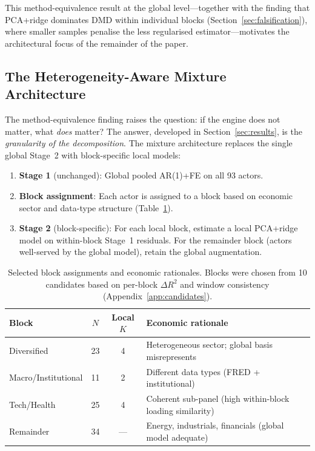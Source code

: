 \documentclass[11pt,a4paper]{article}
\begin{document}
This method-equivalence result at the global level---together with the finding that PCA+ridge dominates DMD within individual blocks (Section~\ref{sec:falsification}), where smaller samples penalise the less regularised estimator---motivates the architectural focus of the remainder of the paper.

\subsection{The Heterogeneity-Aware Mixture Architecture}
\label{sec:mixture_arch}

The method-equivalence finding raises the question: if the engine does not matter, what \emph{does} matter? The answer, developed in Section~\ref{sec:results}, is the \emph{granularity of the decomposition}. The mixture architecture replaces the single global Stage~2 with block-specific local models:

\begin{enumerate}[nosep]
  \item \textbf{Stage 1} (unchanged): Global pooled AR(1)+FE on all 93 actors.
  \item \textbf{Block assignment}: Each actor is assigned to a block based on economic sector and data-type structure (Table~\ref{tab:blocks}).
  \item \textbf{Stage 2} (block-specific): For each local block, estimate a local PCA+ridge model on within-block Stage~1 residuals. For the remainder block (actors well-served by the global model), retain the global augmentation.
\end{enumerate}

\begin{table}[H]
\centering
\caption{Selected block assignments and economic rationales. Blocks were chosen from 10 candidates based on per-block $\Delta R^2$ and window consistency (Appendix~\ref{app:candidates}).}
\label{tab:blocks}
\small
\begin{tabular}{lccl}
\toprule
Block & $N$ & Local $K$ & Economic rationale \\
\midrule
Diversified & 23 & 4 & Heterogeneous sector; global basis misrepresents \\
Macro/Institutional & 11 & 2 & Different data types (FRED + institutional) \\
Tech/Health & 25 & 4 & Coherent sub-panel (high within-block loading similarity) \\
Remainder & 34 & --- & Energy, industrials, financials (global model adequate) \\
\bottomrule
\end{tabular}
\end{table}
\end{document}
